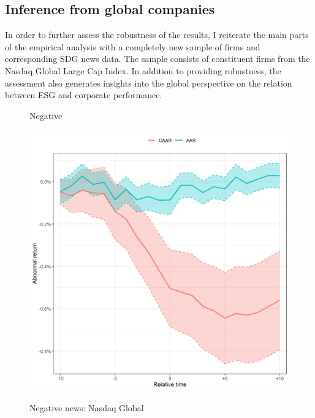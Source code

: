 \subsection{Inference from global companies}

In order to further assess the robustness of the results, I reiterate the main parts of the empirical analysis with a completely new sample of firms and corresponding SDG news data. The sample consists of constituent firms from the Nasdaq Global Large Cap Index. In addition to providing robustness, the assessment also generates insights into the global perspective on the relation between ESG and corporate performance. 



\begin{figure}
     \centering
     \begin{minipage}[b]{0.49\textwidth}
         \centering
    \caption{Negative}
    \includegraphics[width=\textwidth]{Projekt/1.Figures analysis/ST_negative_all_CI_nasdaq.png}
     \label{fig:ST_neg_sensitivity_nasdaq}
     \end{minipage}
     \hfill
     \begin{minipage}[b]{0.49\textwidth}
       \centering
    \caption{Negative news: Nasdaq Global}

\end{minipage}
\end{figure}
